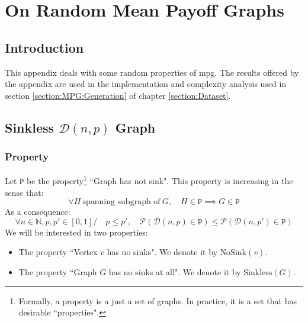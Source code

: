 \chapter{On Random Mean Payoff Graphs}
\label{appendix:RandomGraphs}


\section*{Introduction}
This appendix deals with some random properties of \acrshort{mpg}. The results offered by the appendix are used in the implementation and complexity analysis used in section \ref{section:MPG:Generation} of chapter \ref{section:Dataset}.

\section{Sinkless $\mathcal{D}(n,p)$ Graph}

\subsection{Property}

Let $\mathtt{P}$ be the property\footnote{Formally, a property is a just a set of graphs. In practice, it is a set that has desirable ``properties".} ``Graph has not sink".
\newline This property is increasing in the sense that:
$$
\forall H \ \text{spanning subgraph of}\ G, \quad H \in \mathtt{P}\implies G\in\mathtt{P}
$$
As a consequence:
$$
\forall n\in\mathbb{N},p,p'\in[0,1] / \quad p\le p',\quad \mathscr{P}(\mathcal{D}(n,p)\in \mathtt{P}) \le \mathscr{P}(\mathcal{D}(n,p')\in \mathtt{P})
$$
We will be interested in two properties:
\begin{itemize}
	\item The property ``Vertex $v$ has no sinks". We denote it by $\text{NoSink}(v)$.
	\item The property ``Graph $G$ has no sinks at all". We denote it by $\text{Sinkless}(G)$.
\end{itemize}

